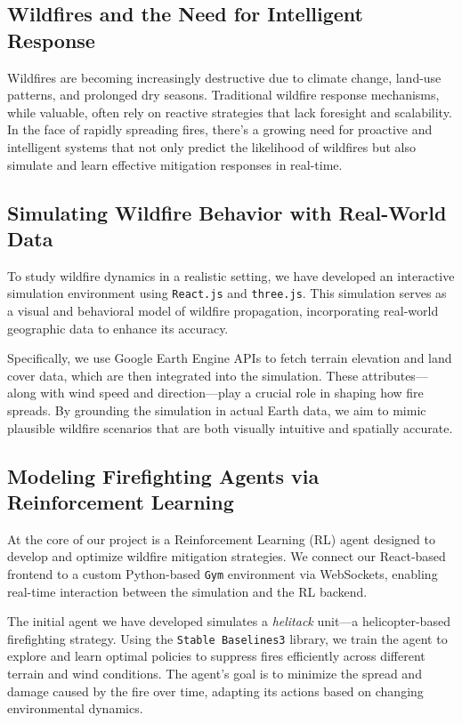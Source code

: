 \documentclass[conference]{IEEEtran}
\begin{document}
\subsection{Wildfires and the Need for Intelligent Response}
Wildfires are becoming increasingly destructive due to climate change, land-use patterns, and prolonged dry seasons. Traditional wildfire response mechanisms, while valuable, often rely on reactive strategies that lack foresight and scalability. In the face of rapidly spreading fires, there's a growing need for proactive and intelligent systems that not only predict the likelihood of wildfires but also simulate and learn effective mitigation responses in real-time.

\subsection{Simulating Wildfire Behavior with Real-World Data}
To study wildfire dynamics in a realistic setting, we have developed an interactive simulation environment using \texttt{React.js} and \texttt{three.js}. This simulation serves as a visual and behavioral model of wildfire propagation, incorporating real-world geographic data to enhance its accuracy.

\noindent
Specifically, we use Google Earth Engine APIs to fetch terrain elevation and land cover data, which are then integrated into the simulation. These attributes—along with wind speed and direction—play a crucial role in shaping how fire spreads. By grounding the simulation in actual Earth data, we aim to mimic plausible wildfire scenarios that are both visually intuitive and spatially accurate.

\subsection{Modeling Firefighting Agents via Reinforcement Learning}
At the core of our project is a Reinforcement Learning (RL) agent designed to develop and optimize wildfire mitigation strategies. We connect our React-based frontend to a custom Python-based \texttt{Gym} environment via WebSockets, enabling real-time interaction between the simulation and the RL backend.

\noindent
The initial agent we have developed simulates a \textit{helitack} unit—a helicopter-based firefighting strategy. Using the \texttt{Stable Baselines3} library, we train the agent to explore and learn optimal policies to suppress fires efficiently across different terrain and wind conditions. The agent's goal is to minimize the spread and damage caused by the fire over time, adapting its actions based on changing environmental dynamics.
\end{document}
